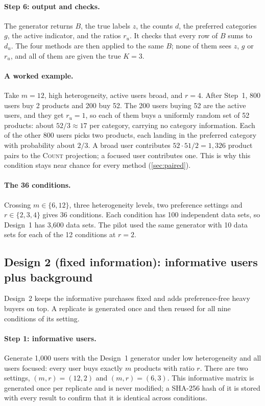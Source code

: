 \documentclass[12pt]{article}
\newcommand{\Count}{\textsc{Count}}
\begin{document}
\paragraph{Step 6: output and checks.} The generator returns $B$, the true labels $z$, the counts $d$, the preferred categories $g$, the active indicator, and the ratios $r_u$. It checks that every row of $B$ sums to $d_u$. The four methods are then applied to the same $B$; none of them sees $z$, $g$ or $r_u$, and all of them are given the true $K=3$.

\paragraph{A worked example.} Take $m=12$, high heterogeneity, active users broad, and $r=4$. After Step~1, 800 users buy 2 products and 200 buy 52. The 200 users buying 52 are the active users, and they get $r_u=1$, so each of them buys a uniformly random set of 52 products: about $52/3\approx17$ per category, carrying no category information. Each of the other 800 users picks two products, each landing in the preferred category with probability about $2/3$. A broad user contributes $52\cdot51/2=1{,}326$ product pairs to the \Count{} projection; a focused user contributes one. This is why this condition stays near chance for every method (\cref{sec:paired}).

\paragraph{The 36 conditions.} Crossing $m\in\{6,12\}$, three heterogeneity levels, two preference settings and $r\in\{2,3,4\}$ gives 36 conditions. Each condition has 100 independent data sets, so Design~1 has 3{,}600 data sets. The pilot used the same generator with 10 data sets for each of the 12 conditions at $r=2$.

\subsection{Design 2 (fixed information): informative users plus background}

Design~2 keeps the informative purchases fixed and adds preference-free heavy buyers on top. A replicate is generated once and then reused for all nine conditions of its setting.

\paragraph{Step 1: informative users.} Generate 1{,}000 users with the Design~1 generator under low heterogeneity and all users focused: every user buys exactly $m$ products with ratio $r$. There are two settings, $(m,r)=(12,2)$ and $(m,r)=(6,3)$. This informative matrix is generated once per replicate and is never modified; a SHA-256 hash of it is stored with every result to confirm that it is identical across conditions.
\end{document}
